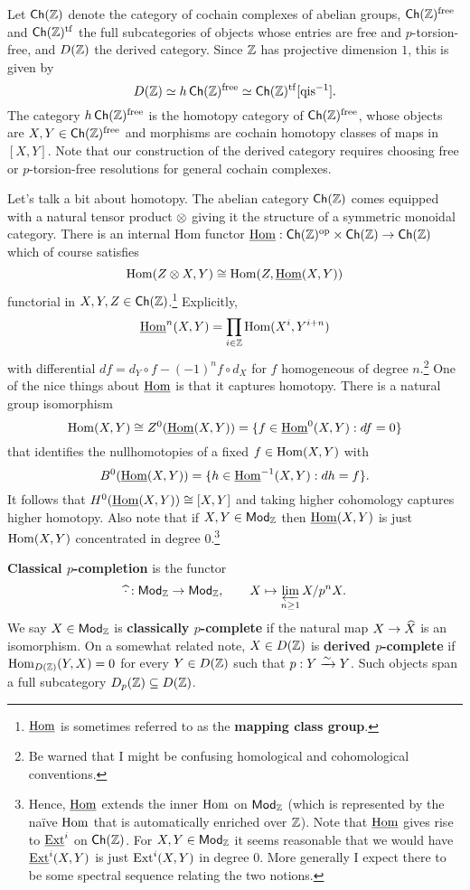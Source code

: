 \documentclass[11pt]{article}
\newcommand{\free}{\textup{free}} %
\begin{document}
Let $\operatorname{\mathsf{Ch}}(\mathbb{Z})$ denote the category of cochain complexes of abelian groups, $\Ch(\Z)^{\free}$ and $\operatorname{\mathsf{Ch}}(\mathbb{Z})^{\operatorname{tf}}$ the full subcategories of objects whose entries are free and $p$-torsion-free, and $D(\mathbb{Z})$ the derived category. Since $\mathbb{Z}$ has projective dimension $1$, this is given by
$$D(\Z)\simeq h\Ch(\Z)^{\free}\simeq\Ch(\Z)^{\tf}[\textrm{qis}^{-1}].$$
The category $h\Ch(\Z)^{\free}$ is the homotopy category of $\Ch(\Z)^{\free}$, whose objects are $X,Y\in\Ch(\Z)^{\free}$ and morphisms are cochain homotopy classes of maps in $[X,Y]$. Note that our construction of the derived category requires choosing free or $p$-torsion-free resolutions for general cochain complexes.

\begin{remark}
Let's talk a bit about homotopy. The abelian category $\operatorname{\mathsf{Ch}}(\mathbb{Z})$ comes equipped with a natural tensor product $\otimes$ giving it the structure of a symmetric monoidal category. There is an internal Hom functor $\underline{\operatorname{Hom}}: \operatorname{\mathsf{Ch}}(\mathbb{Z})^{\operatorname{op}}\times\operatorname{\mathsf{Ch}}(\mathbb{Z})\to\operatorname{\mathsf{Ch}}(\mathbb{Z})$ which of course satisfies
$$\operatorname{Hom}(Z\otimes X,Y)\cong\operatorname{Hom}(Z,\underline{\operatorname{Hom}}(X,Y))$$
functorial in $X,Y,Z\in\operatorname{\mathsf{Ch}}(\mathbb{Z})$.\footnote{$\underline{\operatorname{Hom}}$ is sometimes referred to as the \textbf{mapping class group}.} Explicitly, 
$$\underline{\operatorname{Hom}}^n(X,Y)=\prod_{i\in\mathbb{Z}}\operatorname{Hom}(X^i,Y^{i+n})$$
with differential $df=d_Y\circ f-(-1)^nf\circ d_X$ for $f$ homogeneous of degree $n$.\footnote{Be warned that I might be confusing homological and cohomological conventions.} One of the nice things about $\underline{\operatorname{Hom}}$ is that it captures homotopy. There is a natural group isomorphism
$$\operatorname{Hom}(X,Y)\cong Z^0(\underline{\operatorname{Hom}}(X,Y))=\{f\in\underline{\operatorname{Hom}}^0(X,Y) : df=0\}$$
that identifies the nullhomotopies of a fixed $f\in\operatorname{Hom}(X,Y)$ with 
$$B^0(\underline{\operatorname{Hom}}(X,Y))=\{h\in\underline{\operatorname{Hom}}^{-1}(X,Y) : dh=f\}.$$ 
It follows that $H^0(\underline{\operatorname{Hom}}(X,Y))\cong[X,Y]$ and taking higher cohomology captures higher homotopy. Also note that if $X,Y\in\operatorname{\mathsf{Mod}}_{\mathbb{Z}}$ then $\underline{\operatorname{Hom}}(X,Y)$ is just $\operatorname{Hom}(X,Y)$ concentrated in degree $0$.\footnote{Hence, $\underline{\operatorname{Hom}}$ extends the inner $\operatorname{Hom}$ on $\operatorname{\mathsf{Mod}}_{\mathbb{Z}}$ (which is represented by the na\"{i}ve $\operatorname{Hom}$ that is automatically enriched over $\mathbb{Z}$). Note that $\underline{\operatorname{Hom}}$ gives rise to $\underline{\operatorname{Ext}}^i$ on $\operatorname{\mathsf{Ch}}(\mathbb{Z})$. For $X,Y\in\operatorname{\mathsf{Mod}}_{\mathbb{Z}}$ it seems reasonable that we would have $\underline{\operatorname{Ext}}^i(X,Y)$ is just $\operatorname{Ext}^i(X,Y)$ in degree $0$. More generally I expect there to be some spectral sequence relating the two notions.}
\end{remark}

\begin{definition}
\textbf{Classical $p$-completion} is the functor
$$\widehat{\cdot}: \operatorname{\mathsf{Mod}}_{\mathbb{Z}}\to\operatorname{\mathsf{Mod}}_{\mathbb{Z}},\qquad X\mapsto\displaystyle\varprojlim_{n\geq1}X/p^nX.$$
We say $X\in\operatorname{\mathsf{Mod}}_{\mathbb{Z}}$ is \textbf{classically $p$-complete} if the natural map $X\to\widehat{X}$ is an isomorphism. On a somewhat related note, $X\in D(\mathbb{Z})$ is \textbf{derived $p$-complete} if $\operatorname{Hom}_{D(\mathbb{Z})}(Y,X)=0$ for every $Y\in D(\mathbb{Z})$ such that $p: Y\xrightarrow{\sim}Y$. Such objects span a full subcategory $D_p(\mathbb{Z})\subseteq D(\mathbb{Z})$.
\end{definition}
\end{document}
